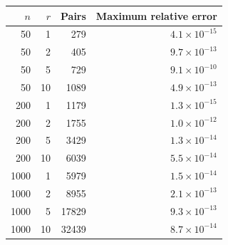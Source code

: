 \begin{tabular}{rrrr}
\toprule
$n$ & $r$ & Pairs & Maximum relative error \\
\midrule
50 & 1 & 279 & $4.1\times10^{-15}$ \\
50 & 2 & 405 & $9.7\times10^{-13}$ \\
50 & 5 & 729 & $9.1\times10^{-10}$ \\
50 & 10 & 1089 & $4.9\times10^{-13}$ \\
200 & 1 & 1179 & $1.3\times10^{-15}$ \\
200 & 2 & 1755 & $1.0\times10^{-12}$ \\
200 & 5 & 3429 & $1.3\times10^{-14}$ \\
200 & 10 & 6039 & $5.5\times10^{-14}$ \\
1000 & 1 & 5979 & $1.5\times10^{-14}$ \\
1000 & 2 & 8955 & $2.1\times10^{-13}$ \\
1000 & 5 & 17829 & $9.3\times10^{-13}$ \\
1000 & 10 & 32439 & $8.7\times10^{-14}$ \\
\bottomrule
\end{tabular}
